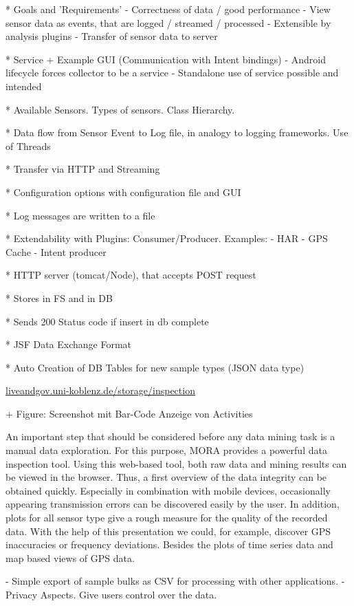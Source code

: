 \documentclass[times, 10pt,twocolumn]{article}
\begin{document}
* Goals and 'Requirements'
  - Correctness of data / good performance
  - View sensor data as events, that are logged / streamed / processed
  - Extensible by analysis plugins
  - Transfer of sensor data to server

* Service + Example GUI (Communication with Intent bindings)
  - Android lifecycle forces collector to be a service
  - Standalone use of service possible and intended

* Available Sensors. Types of sensors. Class Hierarchy.

* Data flow from Sensor Event to Log file,
  in analogy to logging frameworks.
  Use of Threads

* Transfer via HTTP and Streaming

* Configuration options with configuration file and GUI

* Log messages are written to a file

* Extendability with Plugins: Consumer/Producer. Examples:
  - HAR
  - GPS Cache
  - Intent producer


* HTTP server (tomcat/Node), that accepts POST request

* Stores in FS and in DB

* Sends 200 Status code if insert in db complete

* JSF Data Exchange Format

* Auto Creation of DB Tables for new sample types (JSON data type)

\url{liveandgov.uni-koblenz.de/storage/inspection}

+ Figure: Screenshot mit Bar-Code Anzeige von Activities


An important step that should be considered before any data mining task is a manual data exploration. For this purpose, MORA provides a powerful data inspection tool. Using this web-based tool, both raw data and mining results can be viewed in the browser. Thus, a first overview of the data integrity can be obtained quickly. Especially in combination with mobile devices, occasionally appearing transmission errors can be discovered easily by the user. In addition, plots for all sensor type give a rough measure for the quality of the recorded data. With the help of this presentation we could, for example, discover GPS inaccuracies or frequency deviations. Besides the plots of time series data and map based views of GPS data.

  
  - Simple export of sample bulks as CSV for processing with other applications.
  - Privacy Aspects. Give users control over the data.
\end{document}
